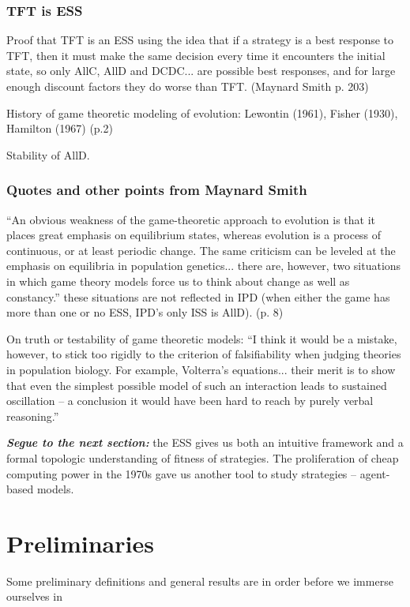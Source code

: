\subsection{TFT is ESS}
Proof that TFT is an ESS using the idea that if a strategy is a best response to TFT, then it must make the same decision every time it encounters the initial state, so only AllC, AllD and DCDC... are possible best responses, and for large enough discount factors they do worse than TFT. (Maynard Smith p. 203)



History of game theoretic modeling of evolution: Lewontin (1961), Fisher (1930), Hamilton (1967) (p.2)

Stability of AllD.

\subsection{Quotes and other points from Maynard Smith}
``An obvious weakness of the game-theoretic approach to evolution is that it places great emphasis on equilibrium states, whereas evolution is a process of continuous, or at least periodic change. The same criticism can be leveled at the emphasis on equilibria in population genetics... there are, however, two situations in which game theory models force us to think about change as well as constancy.'' these situations are not reflected in IPD (when either the game has more than one or no ESS, IPD's only ISS is AllD). (p. 8)

On truth or testability of game theoretic models: ``I think it would be a mistake, however, to stick too rigidly to the criterion of falsifiability when judging theories in population biology. For example, Volterra's equations... their merit is to show that even the simplest possible model of such an interaction leads to sustained oscillation -- a conclusion it would have been hard to reach by purely verbal reasoning.''

\textit{\textbf{Segue to the next section:}} the ESS gives us both an intuitive framework and a formal topologic understanding of fitness of strategies. The proliferation of cheap computing power in the 1970s gave us another tool to study strategies -- agent-based models.

\chapter{Preliminaries}


Some preliminary definitions and general results are in order before we immerse ourselves in 


